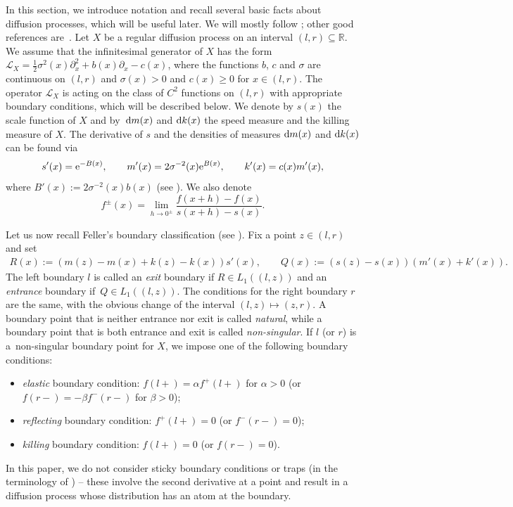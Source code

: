 \documentclass[10pt,a4paper]{amsart}
\numberwithin{equation}{section}
\theoremstyle{definition}
\def\r{{\mathbb R}}
\def\d{{\textnormal d}}
\begin{document}
In this section, we introduce notation and recall several basic facts about diffusion processes, which will be useful later. We will mostly follow \cite[Chapter II]{Borodin2002}; other good references are~\cite{ItoMcKean_1974,Mandl1968}.
Let $X$ be a regular diffusion process on an interval $(l,r)\subseteq \r$. We assume that the infinitesimal generator of $X$ has the form
$
{\mathcal L}_X=\frac{1}{2} \sigma^2(x) \partial_x^2 + b(x) \partial_x - c(x)$,
where the functions $b$, $c$ and $\sigma$ are continuous on $(l,r)$ and $\sigma(x)>0$ and $c(x)\ge 0$ for $x\in (l,r)$.
The operator ${\mathcal L}_X$ is acting on the class of $C^2$ functions on $(l, r)$ with appropriate boundary conditions, which will be described below. We denote by $s(x)$ the scale function of $X$ and by~$\d m(x)$ and $\d k(x)$ the speed measure and the killing measure of $X$. The derivative of $s$ and the densities of measures $\d m(x)$ and $\d k(x)$ can be found via
\begin{equation}\label{eqn:s_m_k_prime}
s'(x)={\rm e}^{-B(x)}, \qquad m'(x)=2\sigma^{-2}(x) {\rm e}^{B(x)}, \qquad k'(x)=c(x) m'(x),
\end{equation}
where $B'(x):=2 \sigma^{-2}(x) b(x)$ (see \cite[Section II.9]{Borodin2002}).
We also denote
\[
f^{\pm}(x)=\lim\limits_{h\to 0^{\pm}} \frac{f(x+h)-f(x)}{s(x+h)-s(x)}.
\]

Let us now recall Feller's boundary classification (see \cite[Section II.6]{Borodin2002}). Fix a point $z\in (l,r)$ and set
\begin{gather}\label{def:R_Q}
R(x):=(m(z)-m(x)+k(z)-k(x)) s'(x), \!\qquad Q(x):=(s(z)-s(x)) (m'(x)+k'(x)).\!\!\!
\end{gather}
The left boundary $l$ is called an {\it exit} boundary if $R\in L_1((l,z))$ and an {\it entrance} boundary if~${Q \in L_1((l,z))}$. \label{R_Q_L1} The conditions for the right boundary $r$ are the same, with the obvious change of the interval $(l,z) \mapsto (z,r)$. A boundary point that is neither entrance nor exit is called {\it natural}, while a boundary point that is both entrance and exit is called {\it non-singular}. If $l$ (or $r$) is a~non-singular boundary point for $X$, we impose one of the following boundary conditions:
\label{elastic_boundary_condition}
\begin{itemize}\itemsep=0pt
\item[(i)] {\it elastic} boundary condition: $f(l+)=\alpha f^+(l+)$ for $\alpha >0 $ (or $f(r-)=-\beta f^-(r-)$ for $\beta > 0$);
\item[(ii)] {\it reflecting} boundary condition: $f^+(l+)=0$ (or $f^-(r-)=0$);
\item[(iii)] {\it killing} boundary condition: $f(l+)=0$ (or $f(r-)=0$).
\end{itemize}
In this paper, we do not consider sticky boundary conditions or traps (in the terminology of \cite[Section II.7]{Borodin2002}) -- these involve the second derivative at a point and result in a diffusion process whose distribution has an atom at the boundary.
\end{document}
